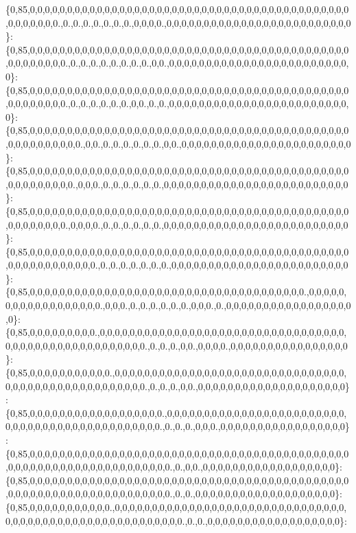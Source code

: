 \{0,85,0,0,0,0,0,0,0,0,0,0,0,0,0,0,0,0,0,0,0,0,0,0,0,0,0,0,0,0,0,0,0,0,0,0,0,0,0,0,0,0,0,0,0,0,0,0,0,0,0,0.,0.,0.,0.,0.,0.,0.,0.,0,0,0,0.,0,0,0,0,0,0,0,0,0,0,0,0,0,0,0,0,0,0,0,0,0,0,0,0,0\}\+: \{0,85,0,0,0,0,0,0,0,0,0,0,0,0,0,0,0,0,0,0,0,0,0,0,0,0,0,0,0,0,0,0,0,0,0,0,0,0,0,0,0,0,0,0,0,0,0,0,0,0,0,0,0.,0.,0.,0.,0.,0.,0.,0.,0.,0,0.,0,0,0,0,0,0,0,0,0,0,0,0,0,0,0,0,0,0,0,0,0,0,0,0,0\}\+: \{0,85,0,0,0,0,0,0,0,0,0,0,0,0,0,0,0,0,0,0,0,0,0,0,0,0,0,0,0,0,0,0,0,0,0,0,0,0,0,0,0,0,0,0,0,0,0,0,0,0,0,0,0.,0.,0.,0.,0.,0.,0.,0,0.,0.,0.,0,0,0,0,0,0,0,0,0,0,0,0,0,0,0,0,0,0,0,0,0,0,0,0,0\}\+: \{0,85,0,0,0,0,0,0,0,0,0,0,0,0,0,0,0,0,0,0,0,0,0,0,0,0,0,0,0,0,0,0,0,0,0,0,0,0,0,0,0,0,0,0,0,0,0,0,0,0,0,0,0,0,0.,0,0.,0.,0.,0.,0.,0.,0.,0,0.,0,0,0,0,0,0,0,0,0,0,0,0,0,0,0,0,0,0,0,0,0,0,0\}\+: \{0,85,0,0,0,0,0,0,0,0,0,0,0,0,0,0,0,0,0,0,0,0,0,0,0,0,0,0,0,0,0,0,0,0,0,0,0,0,0,0,0,0,0,0,0,0,0,0,0,0,0,0,0,0.,0,0,0.,0.,0.,0.,0.,0.,0.,0,0,0,0,0,0,0,0,0,0,0,0,0,0,0,0,0,0,0,0,0,0,0,0,0\}\+: \{0,85,0,0,0,0,0,0,0,0,0,0,0,0,0,0,0,0,0,0,0,0,0,0,0,0,0,0,0,0,0,0,0,0,0,0,0,0,0,0,0,0,0,0,0,0,0,0,0,0,0,0,0.,0,0,0,0.,0.,0.,0.,0.,0.,0.,0,0,0,0,0,0,0,0,0,0,0,0,0,0,0,0,0,0,0,0,0,0,0,0,0\}\+: \{0,85,0,0,0,0,0,0,0,0,0,0,0,0,0,0,0,0,0,0,0,0,0,0,0,0,0,0,0,0,0,0,0,0,0,0,0,0,0,0,0,0,0,0,0,0,0,0,0,0,0,0,0,0,0,0,0.,0.,0.,0.,0.,0.,0.,0.,0,0,0,0,0,0,0,0,0,0,0,0,0,0,0,0,0,0,0,0,0,0,0,0\}\+: \{0,85,0,0,0,0,0,0,0,0,0,0,0,0,0,0,0,0,0,0,0,0,0,0,0,0,0,0,0,0,0,0,0,0,0,0,0,0,0.,0,0,0,0,0,0,0,0,0,0,0,0,0,0,0,0,0,0.,0,0,0.,0.,0.,0.,0.,0.,0.,0,0,0.,0.,0,0,0,0,0,0,0,0,0,0,0,0,0,0,0,0,0,0\}\+: \{0,85,0,0,0,0,0,0,0,0,0.,0,0,0,0,0,0,0,0,0,0,0,0,0,0,0,0,0,0,0,0,0,0,0,0,0,0,0,0,0,0,0,0,0,0,0,0,0,0,0,0,0,0,0,0,0,0,0,0,0,0,0,0.,0.,0.,0.,0,0.,0,0,0,0.,0,0,0,0,0,0,0,0,0,0,0,0,0,0,0,0\}\+: \{0,85,0,0,0,0,0,0,0,0,0,0,0.,0,0,0,0,0,0,0,0,0,0,0,0,0,0,0,0,0,0,0,0,0,0,0,0,0,0,0,0,0,0,0,0,0,0,0,0,0,0,0,0,0,0,0,0,0,0,0,0,0,0.,0.,0.,0.,0,0.,0,0,0,0,0,0,0,0,0,0,0,0,0,0,0,0,0,0,0,0\}\+: \{0,85,0,0,0,0,0,0,0,0,0,0,0,0,0,0,0,0,0,0.,0,0,0,0,0,0,0,0,0,0,0,0,0,0,0,0,0,0,0,0,0,0,0,0,0,0,0,0,0,0,0,0,0,0,0,0,0,0,0,0,0,0,0,0,0.,0.,0.,0.,0,0,0.,0,0,0,0,0,0,0,0,0,0,0,0,0,0,0,0,0\}\+: \{0,85,0,0,0,0,0,0,0,0,0,0,0,0,0,0,0,0,0,0,0,0,0,0,0,0,0,0,0,0,0,0,0,0,0,0,0,0,0,0,0,0,0,0,0,0,0,0,0,0,0,0,0,0,0,0,0,0,0,0,0,0,0,0,0,0,0.,0.,0,0.,0,0,0,0,0,0,0,0,0,0,0,0,0,0,0,0,0,0\}\+: \{0,85,0,0,0,0,0,0,0,0,0,0,0,0,0,0,0,0,0,0,0,0,0,0,0,0,0,0,0,0,0,0,0,0,0,0,0,0,0,0,0,0,0,0,0,0,0,0,0,0,0,0,0,0,0,0,0,0,0,0,0,0,0,0,0,0,0.,0.,0.,0,0,0,0,0,0,0,0,0,0,0,0,0,0,0,0,0,0,0\}\+: \{0,85,0,0,0,0,0,0,0,0,0,0,0.,0,0,0,0,0,0,0,0,0,0,0,0,0,0,0,0,0,0,0,0,0,0,0,0,0,0,0,0,0,0,0,0,0,0,0,0,0,0,0,0,0,0,0,0,0,0,0,0,0,0,0,0,0,0,0.,0.,0.,0,0,0,0,0,0,0,0,0,0,0,0,0,0,0,0,0,0\}\+: 